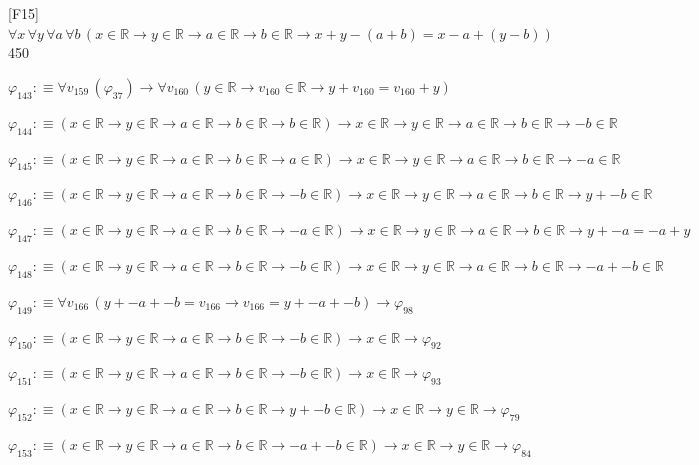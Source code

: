 \begin{fullproof}{[F15]}{$\forall x\,\forall y\,\forall a\,\forall b\,(x \in \mathbb{R} \to y \in \mathbb{R} \to a \in \mathbb{R} \to b \in \mathbb{R} \to x + y - (a + b) = x - a + (y - b))$}{450}
\begin{abbrevlist}
\item $\varphi_{143} :\equiv \forall v_{159}\,(\varphi_{37}) \to \forall v_{160}\,(y \in \mathbb{R} \to v_{160} \in \mathbb{R} \to y + v_{160} = v_{160} + y)$
\item $\varphi_{144} :\equiv (x \in \mathbb{R} \to y \in \mathbb{R} \to a \in \mathbb{R} \to b \in \mathbb{R} \to b \in \mathbb{R}) \to x \in \mathbb{R} \to y \in \mathbb{R} \to a \in \mathbb{R} \to b \in \mathbb{R} \to -b \in \mathbb{R}$
\item $\varphi_{145} :\equiv (x \in \mathbb{R} \to y \in \mathbb{R} \to a \in \mathbb{R} \to b \in \mathbb{R} \to a \in \mathbb{R}) \to x \in \mathbb{R} \to y \in \mathbb{R} \to a \in \mathbb{R} \to b \in \mathbb{R} \to -a \in \mathbb{R}$
\item $\varphi_{146} :\equiv (x \in \mathbb{R} \to y \in \mathbb{R} \to a \in \mathbb{R} \to b \in \mathbb{R} \to -b \in \mathbb{R}) \to x \in \mathbb{R} \to y \in \mathbb{R} \to a \in \mathbb{R} \to b \in \mathbb{R} \to y + -b \in \mathbb{R}$
\item $\varphi_{147} :\equiv (x \in \mathbb{R} \to y \in \mathbb{R} \to a \in \mathbb{R} \to b \in \mathbb{R} \to -a \in \mathbb{R}) \to x \in \mathbb{R} \to y \in \mathbb{R} \to a \in \mathbb{R} \to b \in \mathbb{R} \to y + -a = -a + y$
\item $\varphi_{148} :\equiv (x \in \mathbb{R} \to y \in \mathbb{R} \to a \in \mathbb{R} \to b \in \mathbb{R} \to -b \in \mathbb{R}) \to x \in \mathbb{R} \to y \in \mathbb{R} \to a \in \mathbb{R} \to b \in \mathbb{R} \to -a + -b \in \mathbb{R}$
\item $\varphi_{149} :\equiv \forall v_{166}\,(y + -a + -b = v_{166} \to v_{166} = y + -a + -b) \to \varphi_{98}$
\item $\varphi_{150} :\equiv (x \in \mathbb{R} \to y \in \mathbb{R} \to a \in \mathbb{R} \to b \in \mathbb{R} \to -b \in \mathbb{R}) \to x \in \mathbb{R} \to \varphi_{92}$
\item $\varphi_{151} :\equiv (x \in \mathbb{R} \to y \in \mathbb{R} \to a \in \mathbb{R} \to b \in \mathbb{R} \to -b \in \mathbb{R}) \to x \in \mathbb{R} \to \varphi_{93}$
\item $\varphi_{152} :\equiv (x \in \mathbb{R} \to y \in \mathbb{R} \to a \in \mathbb{R} \to b \in \mathbb{R} \to y + -b \in \mathbb{R}) \to x \in \mathbb{R} \to y \in \mathbb{R} \to \varphi_{79}$
\item $\varphi_{153} :\equiv (x \in \mathbb{R} \to y \in \mathbb{R} \to a \in \mathbb{R} \to b \in \mathbb{R} \to -a + -b \in \mathbb{R}) \to x \in \mathbb{R} \to y \in \mathbb{R} \to \varphi_{84}$

\end{abbrevlist}
\end{fullproof}
